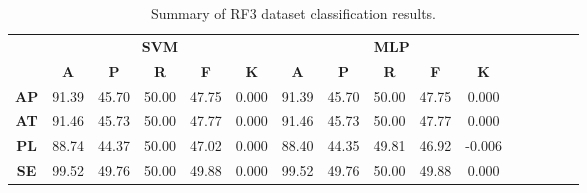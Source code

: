 \begin{landscape}
\begin{table}[htbp]
\footnotesize
\centering
\caption{Summary of RF3 dataset classification results.}
\label{tab:base_female}
\begin{tabular}{|c|c|c|c|c|c|c|c|c|c|c|c|c|c|c|c|}
\hline
\multirow{2}{*}{}	& \multicolumn{5}{c|}{\textbf{SVM}}												& \multicolumn{5}{c|}{\textbf{MLP}}												\\ \cline{2-11} 
					& \textbf{A}	& \textbf{P}	& \textbf{R}	& \textbf{F}	& \textbf{K}	& \textbf{A}	& \textbf{P}	& \textbf{R}	& \textbf{F}	& \textbf{K}	\\ \hline
\textbf{AP}			& 91.39			& 45.70			& 50.00			& 47.75			& 0.000			& 91.39			& 45.70			& 50.00			& 47.75			& 0.000			\\ \hline
\textbf{AT}			& 91.46			& 45.73			& 50.00			& 47.77			& 0.000			& 91.46			& 45.73			& 50.00			& 47.77			& 0.000			\\ \hline
\textbf{PL}			& 88.74			& 44.37			& 50.00			& 47.02			& 0.000			& 88.40			& 44.35			& 49.81			& 46.92			& -0.006			\\ \hline
\textbf{SE}			& 99.52			& 49.76			& 50.00			& 49.88			& 0.000			& 99.52			& 49.76			& 50.00			& 49.88			& 0.000			\\ \hline
\end{tabular}
\end{table}
\end{landscape}